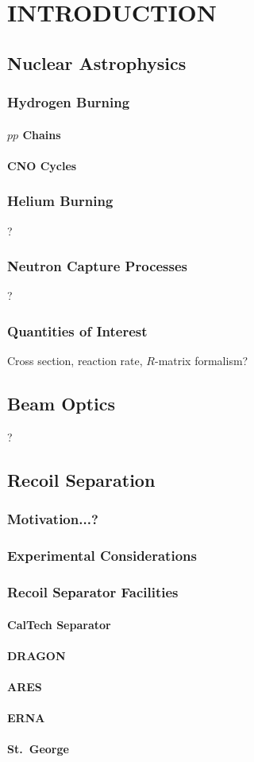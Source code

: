 \chapter{INTRODUCTION}

\section{Nuclear Astrophysics}
\subsection{Hydrogen Burning}
\subsubsection{$pp$ Chains}
\subsubsection{CNO Cycles}
\subsection{Helium Burning}
?
\subsection{Neutron Capture Processes}
?
\subsection{Quantities of Interest}
Cross section, reaction rate, $R$-matrix formalism?

\section{Beam Optics}
?

\section{Recoil Separation}
\subsection{Motivation...?}
\subsection{Experimental Considerations}
\subsection{Recoil Separator Facilities}
\subsubsection{CalTech Separator}
\subsubsection{DRAGON}
\subsubsection{ARES}
\subsubsection{ERNA}
\subsubsection{St.\ George}
